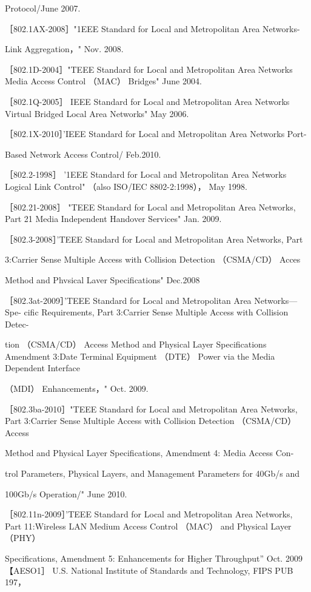 Protocol/June 2007.

［802.1AX-2008］"1EEE Standard for Local and Metropolitan Area Networks-

Link Aggregation，" Nov. 2008.

［802.1D-2004］"TEEE Standard for Local and Metropolitan Area Networks Media
Access Control （MAC） Bridges" June 2004.

［802.1Q-2005］ IEEE Standard for Local and Metropolitan Area Networks Virtual
Bridged Local Area Networks" May 2006.

［802.1X-2010］'IEEE Standard for Local and Metropolitan Area Networks Port-

Based Network Access Control/ Feb.2010.

［802.2-1998］ '1EEE Standard for Local and Metropolitan Area Networks Logical
Link Control" （also ISO/IEC 8802-2:1998）， May 1998.

［802.21-2008］ "TEEE Standard for Local and Metropolitan Area Networks, Part 21
Media Independent Handover Services" Jan. 2009.

［802.3-2008］'TEEE Standard for Local and Metropolitan Area Networks, Part

3:Carrier Sense Multiple Access with Collision Detection （CSMA/CD） Acces

Method and Phvsical Laver Specifications" Dec.2008

［802.3at-2009］'TEEE Standard for Local and Metropolitan Area Networks—Spe-
cific Requirements, Part 3:Carrier Sense Multiple Access with Collision Detec-

tion （CSMA/CD） Access Method and Physical Layer Specifications Amendment
3:Date Terminal Equipment （DTE） Power via the Media Dependent Interface

（MDI） Enhancements，" Oct. 2009.

［802.3ba-2010］"TEEE Standard for Local and Metropolitan Area Networks, Part
3:Carrier Sense Multiple Access with Collision Detection （CSMA/CD） Access

Method and Physical Layer Specifications, Amendment 4: Media Access Con-

trol Parameters, Physical Layers, and Management Parameters for 40Gb/s and

100Gb/s Operation/" June 2010.

［802.11n-2009］'TEEE Standard for Local and Metropolitan Area Networks, Part
11:Wireless LAN Medium Access Control （MAC） and Physical Layer （PHY）

Specifications, Amendment 5: Enhancements for Higher Throughput” Oct. 2009
【AESO1］ U.S. National Institute of Standards and Technology, FIPS PUB 197，


